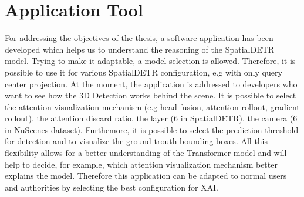 \chapter{Application Tool}
\label{ch:app}
For addressing the objectives of the thesis, a software application has been developed which helps us to understand the reasoning of the SpatialDETR model. Trying to make it adaptable, a model selection is allowed. Therefore, it is possible to use it for various SpatialDETR configuration, e.g with only query center projection. 
At the moment, the application is addressed to developers who want to see how the 3D Detection works behind the scene. 
It is possible to select the attention visualization mechanism (e.g head fusion, attention rollout, gradient rollout), the attention discard ratio, the  layer (6 in SpatialDETR), the camera (6 in NuScenes dataset). 
Furthemore, it is possible to select the prediction threshold for detection and to visualize the ground trouth bounding boxes. All this flexibility allows for a better understanding of the Transformer model and will help to decide, for example, which attention visualization mechanism better explains the model. 
Therefore this application can be adapted to normal users and authorities by selecting the best configuration for XAI.
